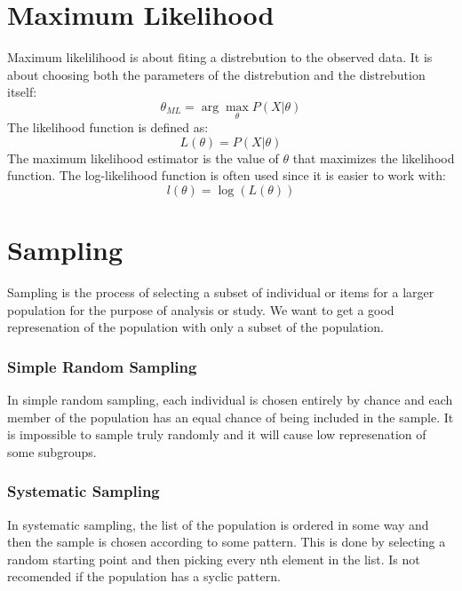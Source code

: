 \section{Maximum Likelihood}
Maximum likelilihood is about fiting a distrebution to the observed data. It is about choosing both the parameters of the distrebution and the distrebution itself:
\begin {equation}
    \theta_{ML} = \arg \max_{\theta} P(X|\theta)
\end{equation}
The likelihood function is defined as:
\begin{equation}
    L(\theta) = P(X|\theta)
\end{equation}
The maximum likelihood estimator is the value of $\theta$ that maximizes the likelihood function. The log-likelihood function is often used since it is easier to work with:
\begin{equation}
    l(\theta) = \log(L(\theta))
\end{equation}

\section{Sampling}
Sampling is the process of selecting a subset of individual or items for a larger population for the purpose of analysis or study. We want to get a good represenation of the population with only a subset of the population. \newline
\subsubsection{Simple Random Sampling}
In simple random sampling, each individual is chosen entirely by chance and each member of the population has an equal chance of being included in the sample. It is impossible to sample truly randomly and it will cause low represenation of some subgroups. \newline

\subsubsection{Systematic Sampling}
In systematic sampling, the list of the population is ordered in some way and then the sample is chosen according to some pattern. This is done by selecting a random starting point and then picking every nth element in the list. Is not recomended if the population has a syclic pattern. \newline

